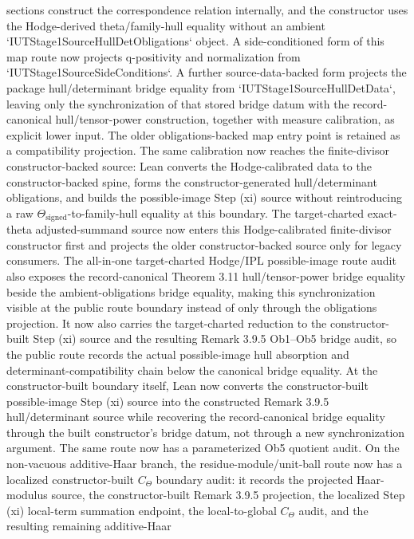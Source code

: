 \documentclass[11pt]{article}
\newcommand{\IPL}{\ensuremath{\mathrm{IPL}}}
\theoremstyle{plain}
\theoremstyle{definition}
\theoremstyle{remark}
\begin{document}
sections construct the correspondence relation internally, and the constructor
uses the Hodge-derived theta/family-hull equality without an ambient
`IUTStage1SourceHullDetObligations` object.  A side-conditioned form of this
map route now projects q-positivity and normalization from
`IUTStage1SourceSideConditions`.  A further source-data-backed form projects
the package hull/determinant bridge equality from
`IUTStage1SourceHullDetData`, leaving only the synchronization of that stored
bridge datum with the record-canonical hull/tensor-power construction, together
with measure calibration, as explicit lower input.  The older
obligations-backed map entry point is retained as a compatibility projection.
The same
calibration now reaches the finite-divisor constructor-backed source: Lean
converts the Hodge-calibrated data to the constructor-backed spine, forms the
constructor-generated hull/determinant obligations, and builds the
possible-image Step (xi) source without reintroducing a raw
\(\Theta_{\mathrm{signed}}\)-to-family-hull equality at this boundary.  The
target-charted exact-theta adjusted-summand source now enters this
Hodge-calibrated finite-divisor constructor first and projects the older
constructor-backed source only for legacy consumers.
The all-in-one target-charted Hodge/\(\IPL\) possible-image route audit also
exposes the record-canonical Theorem 3.11 hull/tensor-power bridge equality
beside the ambient-obligations bridge equality, making this synchronization
visible at the public route boundary instead of only through the obligations
projection.  It now also carries the target-charted reduction to the
constructor-built Step (xi) source and the resulting Remark 3.9.5 Ob1--Ob5
bridge audit, so the public route records the actual possible-image hull
absorption and determinant-compatibility chain below the canonical bridge
equality.  At the constructor-built boundary itself, Lean now converts the
constructor-built possible-image Step (xi) source into the constructed
Remark 3.9.5 hull/determinant source while recovering the record-canonical
bridge equality through the built constructor's bridge datum, not through a new
synchronization argument.  The same route now has a parameterized Ob5 quotient
audit.  On the non-vacuous additive-Haar branch, the residue-module/unit-ball
route now has a localized constructor-built \(C_\Theta\) boundary audit: it
records the projected Haar-modulus source, the constructor-built Remark 3.9.5
projection, the localized Step (xi) local-term summation endpoint, the
local-to-global \(C_\Theta\) audit, and the resulting remaining additive-Haar
\end{document}

